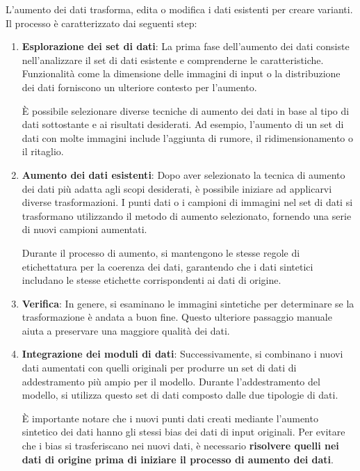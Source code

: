\documentclass[12pt,a4paper,openright,twoside]{book}
\begin{document}
L'aumento dei dati trasforma, edita o modifica i dati esistenti per creare varianti. Il processo è caratterizzato dai seguenti step:
\begin{enumerate}
\item \textbf{Esplorazione dei set di dati}:
La prima fase dell'aumento dei dati consiste nell'analizzare il set di dati esistente e comprenderne le caratteristiche. Funzionalità come la dimensione delle immagini di input o la distribuzione dei dati forniscono un ulteriore contesto per l'aumento. 

È possibile selezionare diverse tecniche di aumento dei dati in base al tipo di dati sottostante e ai risultati desiderati. Ad esempio, l'aumento di un set di dati con molte immagini include l'aggiunta di rumore, il ridimensionamento o il ritaglio. 

\item \textbf{Aumento dei dati esistenti}:
Dopo aver selezionato la tecnica di aumento dei dati più adatta agli scopi desiderati, è possibile iniziare ad applicarvi diverse trasformazioni. I punti dati o i campioni di immagini nel set di dati si trasformano utilizzando il metodo di aumento selezionato, fornendo una serie di nuovi campioni aumentati. 

Durante il processo di aumento, si mantengono le stesse regole di etichettatura per la coerenza dei dati, garantendo che i dati sintetici includano le stesse etichette corrispondenti ai dati di origine.

\item \textbf{Verifica}:
In genere, si esaminano le immagini sintetiche per determinare se la trasformazione è andata a buon fine. Questo ulteriore passaggio manuale aiuta a preservare una maggiore qualità dei dati. 

\item \textbf{Integrazione dei moduli di dati}:
Successivamente, si combinano i nuovi dati aumentati con quelli originali per produrre un set di dati di addestramento più ampio per il modello. Durante l'addestramento del modello, si utilizza questo set di dati composto dalle due tipologie di dati.

È importante notare che i nuovi punti dati creati mediante l'aumento sintetico dei dati hanno gli stessi bias dei dati di input originali. Per evitare che i bias si trasferiscano nei nuovi dati, è necessario \textbf{risolvere quelli nei dati di origine prima di iniziare il processo di aumento dei dati}.
\end{enumerate}
\end{document}
